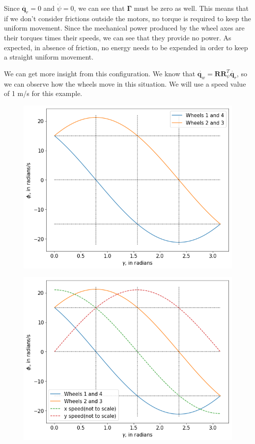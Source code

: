 \documentclass[12pt]{article}
\renewcommand{\vec}[1]{\bm{#1}}
\newcommand{\R}{\mathbb R}
\def\Torque{\vec \Gamma}
\def\R{\vec R}
\def\q{\vec q}
\begin{document}
Since $\ddot{\q_r} = 0$ and $\dot{\psi} = 0$, we can see that $\Torque$ must be zero as well. This means that if we don't consider frictions outside the motors, no torque is required to keep the uniform movement. Since the mechanical power produced by the wheel axes are their torques times their speeds, we can see that they provide no power. As expected, in absence of friction, no energy needs to be expended in order to keep a straight uniform movement.

We can get more insight from this configuration. We know that $\dot{\q_w} = \R \R_{\psi}^T \dot{\q_r}$, so we can observe how the wheels move in this situation. We will use a speed value of 1 m/s for this example.
\begin{figure}[h]
	\centering
	\begin{minipage}{.5\textwidth}
		\centering
		\includegraphics[width=.9\linewidth]{wheel_speeds}
		\label{fig:wheel_speed}
	\end{minipage}%
	\begin{minipage}{.5\textwidth}
		\centering
		\includegraphics[width=.9\linewidth]{wheel_xy_speeds}
		\label{fig:wheel_speed_xy}
	\end{minipage}
\end{figure}
\end{document}
